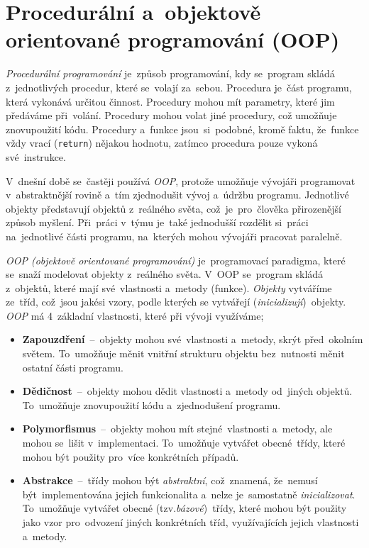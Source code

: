 \documentclass[11pt,a4paper]{report}
\begin{document}
        \section{Procedurální a~objektově orientované programování (OOP)}
            \emph{Procedurální programování} je~způsob programování, kdy se~program skládá z~jednotlivých procedur, které se~volají za~sebou. Procedura je~část programu, která vykonává určitou činnost. Procedury mohou mít parametry, které jim předáváme při~volání. Procedury mohou volat jiné procedury, což umožňuje znovupoužití kódu. Procedury a~funkce jsou~si~podobné, kromě faktu, že~funkce vždy vrací (\texttt{return}) nějakou hodnotu, zatímco procedura pouze vykoná své~instrukce.
            
            V~dnešní době se~častěji používá \emph{OOP}, protože umožňuje vývojáři programovat v~abstraktnější rovině a~tím zjednodušit vývoj a~údržbu programu. Jednotlivé objekty představují  objektů z~reálného světa, což~je~pro~člověka přirozenější způsob myšlení. Při~práci v~týmu je~také jednodušší rozdělit si~práci na~jednotlivé části programu, na~kterých mohou vývojáři pracovat paralelně.
            
            \emph{OOP (objektově orientované programování)} je~programovací paradigma, které se~snaží modelovat objekty z~reálného světa. V~OOP se~program skládá z~objektů, které mají své~vlastnosti a~metody (funkce). \emph{Objekty} vytváříme ze~tříd, což~jsou jakési vzory, podle kterých se vytvářejí (\emph{inicializují})~objekty. \emph{OOP} má 4~základní vlastnosti, které při vývoji využíváme; \cite{Keogh:OOP}
            \begin{itemize}
                \item \textbf{Zapouzdření}~--~objekty mohou své~vlastnosti a~metody, skrýt před~okolním světem. To~umožňuje měnit vnitřní strukturu objektu bez~nutnosti měnit ostatní části programu.
                \item \textbf{Dědičnost}~--~objekty mohou dědit vlastnosti a~metody od~jiných objektů. To~umožňuje znovupoužití kódu a~zjednodušení programu.
                \item \textbf{Polymorfismus}~--~objekty mohou mít stejné~vlastnosti a~metody, ale mohou se~lišit v~implementaci. To~umožňuje vytvářet obecné~třídy, které mohou být použity pro~více konkrétních případů.
                \item \textbf{Abstrakce}~--~třídy mohou být \emph{abstraktní}, což~znamená, že~nemusí být~implementována jejich funkcionalita a~nelze je~samostatně \emph{inicializovat}. To~umožňuje vytvářet obecné (tzv.\emph{bázové})~třídy, které mohou být použity jako vzor pro~odvození jiných konkrétních tříd, využívajících jejich vlastnosti a~metody.
            \end{itemize}
\end{document}
